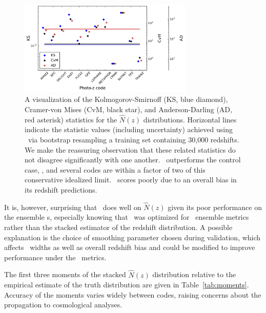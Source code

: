 \begin{figure}
\centering
\includegraphics[width=0.74\textwidth]{fig/KSvsCvMvsAD_NZ_withbootstrap.jpg}
\caption{A visualization of the Kolmogorov-Smirnoff (KS, blue diamond), Cramer-von Mises (CvM, black star), and Anderson-Darling (AD, red asterisk) statistics for the $\hat{N}(z)$ distributions.
Horizontal lines indicate the statistic values (including uncertainty) achieved using \trainz\ via bootstrap resampling a training set containing 30,000 redshifts.
We make the reassuring observation that these related statistics do not disagree significantly with one another.
\cmnn\ outperforms the control case, \trainz, and several codes are within a factor of two of this conservative idealized limit.
\skynet\ scores poorly due to an overall bias in its redshift predictions.}
\label{fig:nz_stats}
\end{figure}

It is, however, surprising that \tpz\ does well on $\hat{N}(z)$ given its poor performance on the ensemble \pzpdf s, especially knowing that \tpz\ was optimized for \pzpdf\ ensemble metrics rather than the stacked estimator of the redshift distribution.
A possible explanation is the choice of smoothing parameter chosen during validation, which affects \pzpdf\ widths as well as overall redshift bias and could be modified to improve performance under the \pzpdf\ metrics.

The first three moments of the stacked $\hat{N}(z)$ distribution relative to the empirical estimate of the truth distribution are given in Table~\ref{tab:moments}.
Accuracy of the moments varies widely between codes, raising concerns about the propagation to cosmological analyses.

